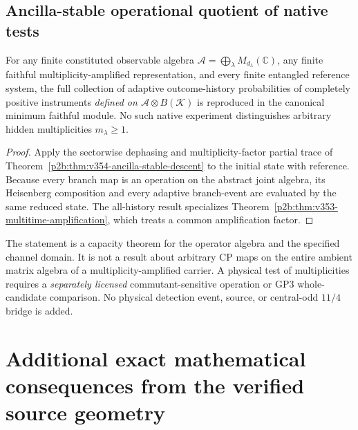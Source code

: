 \documentclass[12pt,a4paper]{article}
\begin{document}
\subsection{Ancilla-stable operational quotient of native tests}
\label{p4a:sec:v355-native-history-quotient}
\begin{proposition}
\label{p4a:prop:v355-ancilla-stable-process-quotient}
For any finite constituted observable algebra
$\mathcal A=\bigoplus_\lambda M_{d_\lambda}(\mathbb C)$,
any finite faithful multiplicity-amplified representation, and every
finite entangled reference system, the full collection of adaptive
outcome-history probabilities of completely positive instruments
\emph{defined on $\mathcal A\otimes B(\mathcal K)$} is reproduced in
the canonical minimum faithful module. No such native experiment
distinguishes arbitrary hidden multiplicities $m_\lambda\ge1$.
\end{proposition}
\begin{proof}
Apply the sectorwise dephasing and multiplicity-factor partial trace
of Theorem~\ref{p2b:thm:v354-ancilla-stable-descent} to the initial
state with reference. Because every branch map is an operation on the
abstract joint algebra, its Heisenberg composition and every adaptive
branch-event are evaluated by the same reduced state. The all-history
result specializes Theorem~\ref{p2b:thm:v353-multitime-amplification},
which treats a common amplification factor.
\end{proof}
\begin{remark}
\label{p4a:rem:v355-native-quotient-scope}
The statement is a capacity theorem for the operator algebra and the
specified channel domain. It is not a result about arbitrary CP maps on
the entire ambient matrix algebra of a multiplicity-amplified carrier.
A physical test of multiplicities requires a \emph{separately licensed}
commutant-sensitive operation or GP3 whole-candidate comparison. No
physical detection event, source, or central-odd $11/4$ bridge is added.
\end{remark}



\section{Additional exact mathematical consequences from the verified source geometry}
\end{document}
